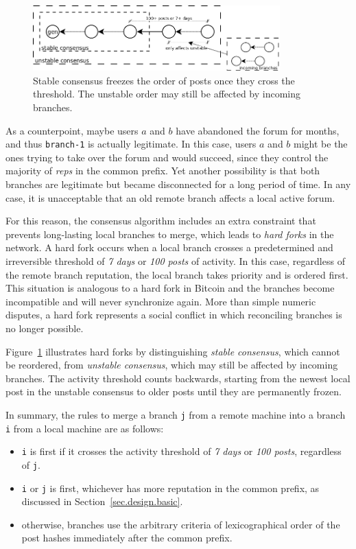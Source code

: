 \documentclass[12pt]{article}
\newcommand{\reps}     {\emph{reps}\xspace}
\newcommand{\code}[1]  {\texttt{\footnotesize{#1}}}
\begin{document}
\begin{figure}
\centering
\includegraphics[width=0.85\textwidth]{n100-d7.png}
\caption{
    Stable consensus freezes the order of posts once they cross the threshold.
    The unstable order may still be affected by incoming branches.
}
\label{fig.hard}
\end{figure}

As a counterpoint, maybe users $a$ and $b$ have abandoned the forum for months,
and thus \code{branch-1} is actually legitimate.
In this case, users $a$ and $b$ might be the ones trying to take over the
forum and would succeed, since they control the majority of \reps in the common
prefix.
Yet another possibility is that both branches are legitimate but became
disconnected for a long period of time.
In any case, it is unacceptable that an old remote branch affects a local
active forum.

For this reason, the consensus algorithm includes an extra constraint that
prevents long-lasting local branches to merge, which leads to \emph{hard forks}
in the network.
A hard fork occurs when a local branch crosses a predetermined and irreversible
threshold of \emph{7 days} or \emph{100 posts} of activity.
In this case, regardless of the remote branch reputation, the local branch
takes priority and is ordered first.
This situation is analogous to a hard fork in Bitcoin and the branches become
incompatible and will never synchronize again.
More than simple numeric disputes, a hard fork represents a social conflict in
which reconciling branches is no longer possible.

Figure~\ref{fig.hard} illustrates hard forks by distinguishing \emph{stable
consensus}, which cannot be reordered, from \emph{unstable consensus}, which
may still be affected by incoming branches.
The activity threshold counts backwards, starting from the newest local post
in the unstable consensus to older posts until they are permanently frozen.

In summary, the rules to merge a branch \code{j} from a remote machine into a
branch \code{i} from a local machine are as follows:
\begin{itemize}
    \item \code{i} is first if it crosses the activity threshold of
          \emph{7 days} or \emph{100 posts}, regardless of \code{j}.
    \item \code{i} or \code{j} is first, whichever has more reputation in the
          common prefix, as discussed in Section~\ref{sec.design.basic}.
    \item otherwise, branches use the arbitrary criteria of lexicographical
          order of the post hashes immediately after the common prefix.
\end{itemize}
\end{document}
